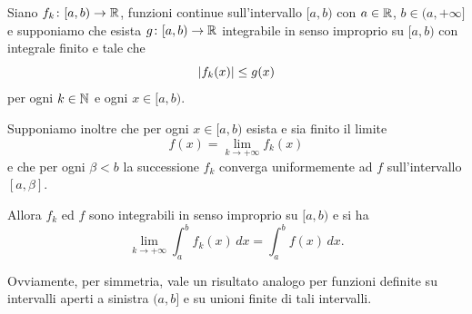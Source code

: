\begin{theorem}
\label{th:convergenza_dominata}%
%
%
Siano $f_k\colon [a,b) \to \mathbb R$, funzioni continue
sull'intervallo $[a,b)$ con $a\in \mathbb R$, $b\in (a,+\infty]$
e supponiamo che esista $g\colon [a,b)\to \mathbb R$
integrabile in senso improprio su $[a,b)$ con integrale finito e tale
che
\[
{\left|f_k(x)\right|}\le g(x)
\]
per ogni $k\in \mathbb N$ e ogni $x\in [a,b)$.

Supponiamo inoltre che per
ogni $x\in[a,b)$ esista e sia finito il limite
\[
  f(x) = \lim_{k\to +\infty} f_k(x)
\]
e che per ogni $\beta<b$ la successione $f_k$ converga uniformemente
ad $f$ sull'intervallo $[a,\beta]$.

Allora $f_k$ ed $f$ sono integrabili in senso improprio su $[a,b)$ e si ha
\[
  \lim_{k\to+\infty} \int_a^b f_k(x)\, dx = \int_a^b f(x)\, dx.
\]

Ovviamente, per simmetria, vale un risultato analogo per funzioni definite su intervalli
aperti a sinistra $(a,b]$ e su unioni finite di tali intervalli.
\end{theorem}
%
